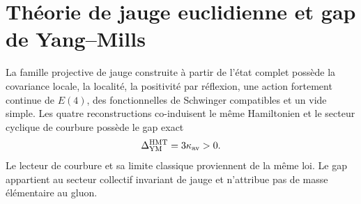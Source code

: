 \section{Théorie de jauge euclidienne et gap de Yang--Mills}

La famille projective de jauge construite à partir de l'état complet possède
la covariance locale, la localité, la positivité par réflexion, une action
fortement continue de \(E(4)\), des fonctionnelles de Schwinger compatibles et un
vide simple. Les quatre reconstructions co-induisent le même Hamiltonien et
le secteur cyclique de courbure possède le gap exact
\[
  \Delta_{\rm YM}^{\rm HMT}=3\kappa_{\rm av}>0.
\]
Le lecteur de courbure et sa limite classique proviennent de la même loi. Le gap
appartient au secteur collectif invariant de jauge et n'attribue pas de masse élémentaire
au gluon.



